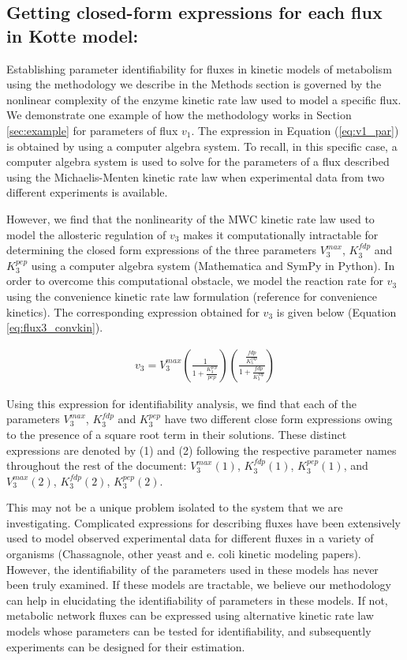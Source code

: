 \documentclass[10pt]{article}
\begin{document}
\subsection{Getting closed-form expressions for each flux in Kotte model:}\label{sec:closedform}
Establishing parameter identifiability for fluxes in kinetic models of metabolism using the methodology we describe in the Methods section is governed by the nonlinear complexity of the enzyme kinetic rate law used to model a specific flux. We demonstrate one example of how the methodology works in Section \ref{sec:example} for parameters of flux $v_1$. The expression in Equation (\ref{eq:v1_par}) is obtained by using a computer algebra system. To recall, in this specific case, a computer algebra system is used to solve for the parameters of a flux described using the Michaelis-Menten kinetic rate law when experimental data from two different experiments is available. 

However, we find that the nonlinearity of the MWC kinetic rate law used to model the allosteric regulation of $v_3$ makes it computationally intractable for determining the closed form expressions of the three parameters $V_3^{max}$, $K_3^{fdp}$ and $K_3^{pep}$ using a computer algebra system (Mathematica and SymPy in Python). In order to overcome this computational obstacle, we model the reaction rate for $v_3$ using the convenience kinetic rate law formulation (reference for convenience kinetics). The corresponding expression obtained for $v_3$ is given below (Equation \ref{eq:flux3_convkin}). 

\begin{align}\label{eq:flux3_convkin}
v_3 = V_3^{max}\left(\frac{1}{1 + \frac{K_3^{pep}}{pep}}\right)\left(\frac{\frac{fdp}{K_3^{fdp}}}{1 + \frac{fdp}{K_3^{fdp}}}\right)
\end{align}

Using this expression for identifiability analysis, we find that each of the parameters $V_3^{max}$, $K_3^{fdp}$ and $K_3^{pep}$ have two different close form expressions owing to the presence of a square root term in their solutions. These distinct expressions are denoted by (1) and (2) following the respective parameter names throughout the rest of the document: $V_3^{max}(1)$, $K_3^{fdp}(1)$, $K_3^{pep}(1)$, and $V_3^{max}(2)$, $K_3^{fdp}(2)$, $K_3^{pep}(2)$. 

This may not be a unique problem isolated to the system that we are investigating. Complicated expressions for describing fluxes have been extensively used to model observed experimental data for different fluxes in a variety of organisms (Chassagnole, other yeast and e. coli kinetic modeling papers). However, the identifiability of the parameters used in these models has never been truly examined. If these models are tractable, we believe our methodology can help in elucidating the identifiability of parameters in these models. If not, metabolic network fluxes can be expressed using alternative kinetic rate law models whose parameters can be tested for identifiability, and subsequently experiments can be designed for their estimation.
\end{document}
